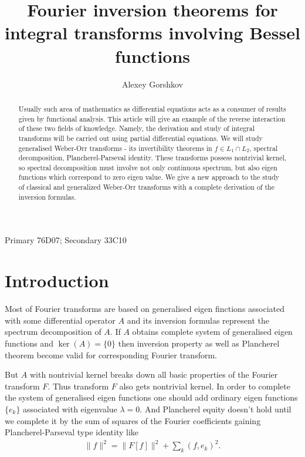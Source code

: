 \documentclass[manuscript, printscheme]{paper}
\title{Fourier inversion theorems for integral transforms involving Bessel functions}
\author{Alexey Gorshkov}
\begin{document}
\maketitle


\begin{abstract} 
Usually such area of mathematics as differential equations acts as a consumer of results given by functional analysis. This article will give an example of the reverse interaction of these two fields of knowledge. Namely, the derivation and study of integral transforms will be carried out using partial differential equations. We will study generalised Weber-Orr transforms - its invertibility theorems in $f\in L_1\cap L_2$, spectral decomposition, Plancherel-Parseval identity. These transforms possess nontrivial kernel, so spectral decomposition must involve not only continuous spectrum, but also eigen functions which correspond to zero eigen value.  We give a new approach to the study of classical and generalized Weber-Orr transforms with a complete derivation of the inversion formulas.
\end{abstract}

{Primary 76D07; Secondary 33C10}

\tableofcontents

\section{Introduction}

Most of Fourier transforms are based on generalised eigen finctions associated with some differential operator $A$ and its inversion formulas represent the spectrum decomposition of $A$. If $A$ obtains complete system of generalised eigen functions and $\ker(A)=\{0\}$ then inversion property as well as Plancherel theorem become valid for corresponding Fourier transform.

But $A$ with nontrivial kernel breaks down all basic properties of the Fourier transform $F$. Thus transform $F$ also gets nontrivial kernel. In order to complete the system of generalised eigen functions one should add ordinary eigen functions $\{e_k\}$ associated with eigenvalue $\lambda=0$. And Plancherel equity doesn't hold until we complete it by the sum of squares of the Fourier coefficients gaining Plancherel-Parseval type identity like 
\begin{eqnarray}\label{intro:PP}
\|f\|^2 = \|F[f]\|^2+\sum_k (f,e_k)^2.
\end{eqnarray}
\end{document}

